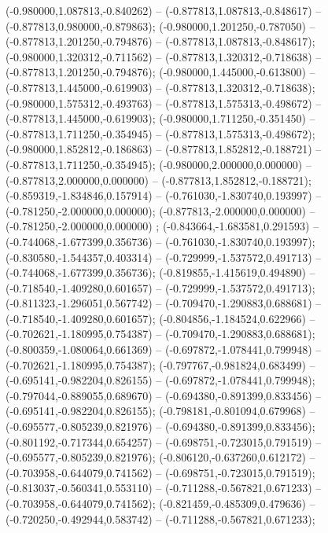  (-0.980000,1.087813,-0.840262) -- (-0.877813,1.087813,-0.848617) -- (-0.877813,0.980000,-0.879863);
 (-0.980000,1.201250,-0.787050) -- (-0.877813,1.201250,-0.794876) -- (-0.877813,1.087813,-0.848617);
 (-0.980000,1.320312,-0.711562) -- (-0.877813,1.320312,-0.718638) -- (-0.877813,1.201250,-0.794876);
 (-0.980000,1.445000,-0.613800) -- (-0.877813,1.445000,-0.619903) -- (-0.877813,1.320312,-0.718638);
 (-0.980000,1.575312,-0.493763) -- (-0.877813,1.575313,-0.498672) -- (-0.877813,1.445000,-0.619903);
 (-0.980000,1.711250,-0.351450) -- (-0.877813,1.711250,-0.354945) -- (-0.877813,1.575313,-0.498672);
 (-0.980000,1.852812,-0.186863) -- (-0.877813,1.852812,-0.188721) -- (-0.877813,1.711250,-0.354945);
 (-0.980000,2.000000,0.000000) -- (-0.877813,2.000000,0.000000) -- (-0.877813,1.852812,-0.188721);
 (-0.859319,-1.834846,0.157914) -- (-0.761030,-1.830740,0.193997) -- (-0.781250,-2.000000,0.000000);
 (-0.877813,-2.000000,0.000000) -- (-0.781250,-2.000000,0.000000) ;
 (-0.843664,-1.683581,0.291593) -- (-0.744068,-1.677399,0.356736) -- (-0.761030,-1.830740,0.193997);
 (-0.830580,-1.544357,0.403314) -- (-0.729999,-1.537572,0.491713) -- (-0.744068,-1.677399,0.356736);
 (-0.819855,-1.415619,0.494890) -- (-0.718540,-1.409280,0.601657) -- (-0.729999,-1.537572,0.491713);
 (-0.811323,-1.296051,0.567742) -- (-0.709470,-1.290883,0.688681) -- (-0.718540,-1.409280,0.601657);
 (-0.804856,-1.184524,0.622966) -- (-0.702621,-1.180995,0.754387) -- (-0.709470,-1.290883,0.688681);
 (-0.800359,-1.080064,0.661369) -- (-0.697872,-1.078441,0.799948) -- (-0.702621,-1.180995,0.754387);
 (-0.797767,-0.981824,0.683499) -- (-0.695141,-0.982204,0.826155) -- (-0.697872,-1.078441,0.799948);
 (-0.797044,-0.889055,0.689670) -- (-0.694380,-0.891399,0.833456) -- (-0.695141,-0.982204,0.826155);
 (-0.798181,-0.801094,0.679968) -- (-0.695577,-0.805239,0.821976) -- (-0.694380,-0.891399,0.833456);
 (-0.801192,-0.717344,0.654257) -- (-0.698751,-0.723015,0.791519) -- (-0.695577,-0.805239,0.821976);
 (-0.806120,-0.637260,0.612172) -- (-0.703958,-0.644079,0.741562) -- (-0.698751,-0.723015,0.791519);
 (-0.813037,-0.560341,0.553110) -- (-0.711288,-0.567821,0.671233) -- (-0.703958,-0.644079,0.741562);
 (-0.821459,-0.485309,0.479636) -- (-0.720250,-0.492944,0.583742) -- (-0.711288,-0.567821,0.671233);

